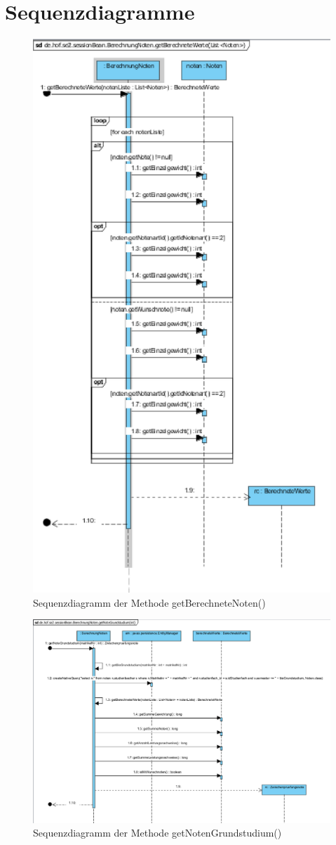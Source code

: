 \documentclass[12pt,a4paper,parskip]{scrreprt}
\begin{document}
\section{Sequenzdiagramme}
\begin{figure}[!h]
\centering
\includegraphics[width=0.7\linewidth]{../VP/getBerechneteNoten}
\caption[Sequenzdiagramm getBerechneteNoten()]{Sequenzdiagramm der Methode getBerechneteNoten()}
\label{fig:getBerechneteNoten}
\end{figure}

\begin{figure}[!h]
\centering
\includegraphics[width=0.7\linewidth]{../VP/getNotenGrundstudium}
\caption[Sequenzdiagramm getNotenGrundstudium()]{Sequenzdiagramm der Methode getNotenGrundstudium()}
\label{fig:getNotenGrundstudium}
\end{figure}
\end{document}
